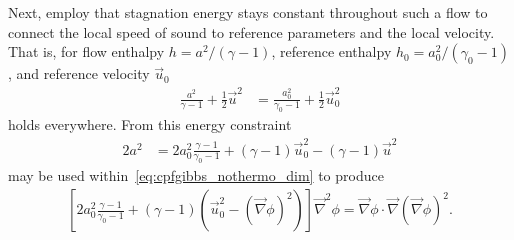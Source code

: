 \documentclass[letterpaper,11pt,nointlimits,reqno]{amsart}
\begin{document}
Next, \citeauthor{Saad2011Coordinate} employ that stagnation energy stays
constant throughout such a flow to connect the local speed of sound to
reference parameters and the local velocity.  That is, for flow enthalpy $h =
a^2 / \left(\gamma-1\right)$, reference enthalpy $h_0 = a_0^2 /
\left(\gamma_0-1\right)$, and reference velocity $\vec{u}_0$
\begin{align}
        \frac{a^2  }{\gamma  -1} + \frac{1}{2} \vec{u}^2
     &= \frac{a_0^2}{\gamma_0-1} + \frac{1}{2} \vec{u}_0^2
\end{align}
holds everywhere. From this energy constraint
\begin{align}
        2a^2
     &=   2a_0^2 \frac{\gamma-1}{\gamma_0-1}
        + \left(\gamma-1\right)\vec{u}_0^2
        - \left(\gamma-1\right)\vec{u}^2
\end{align}
may be used within~\eqref{eq:cpfgibbs_nothermo_dim} to produce
\begin{align}
    \left[
          2a_0^2 \frac{\gamma-1}{\gamma_0-1}
        + \left(\gamma-1\right)
          \left(\vec{u}_0^2 - \left(\vec{\nabla}\phi\right)^2\right)
    \right] \vec{\nabla}^2\phi
     = \vec{\nabla}\phi\cdot \vec{\nabla}\left(\vec{\nabla}\phi\right)^2
\label{eq:cpfgibbs_dim}
.
\end{align}
\end{document}

